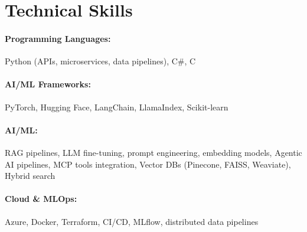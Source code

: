\documentclass[10pt, letterpaper]{article}
\newenvironment{onecolentry}{
    \begin{adjustwidth}{
        0 cm + 0.00001 cm
    }{
        0 cm + 0.00001 cm
    }
}{
    \end{adjustwidth}
} %
\begin{document}
        




\vspace{-1mm}
\section{Technical Skills}

        \paragraph{Programming Languages:} Python (APIs, microservices, data pipelines), C\#, C
        \vspace{-4mm}
        \paragraph{AI/ML Frameworks:} PyTorch, Hugging Face, LangChain, LlamaIndex, Scikit-learn
        \vspace{-4mm}
        \paragraph{AI/ML:} RAG pipelines, LLM fine-tuning, prompt engineering, embedding models, Agentic AI pipelines, MCP tools integration, Vector DBs (Pinecone, FAISS, Weaviate), Hybrid search
        \vspace{-4mm}
        \paragraph{Cloud \& MLOps:} Azure, Docker, Terraform, CI/CD, MLflow, distributed data pipelines
\end{document}
